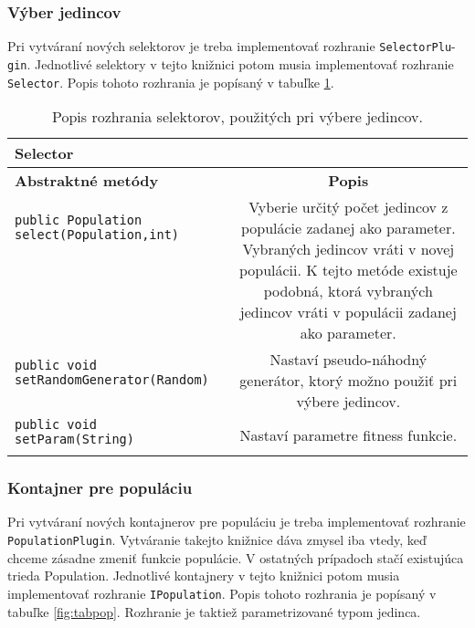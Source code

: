 \subsubsection*{Výber jedincov}
Pri vytváraní nových selektorov je treba implementovať rozhranie \verb|SelectorPlu|- \verb|gin|. Jednotlivé selektory v tejto knižnici potom musia implementovať rozhranie \verb|Selector|. Popis tohoto rozhrania je popísaný v tabuľke \ref{fig:tabsel}.

\begin{table}
\centering
\begin{tabular}{|l|c|}
\hline
\textbf{Selector} & \\
\hline\hline
\textbf{Abstraktné metódy} & \textbf{Popis} \\
\hline
\verb|public Population select(Population,int)| & \multirow{9}{5cm}{Vyberie určitý počet jedincov z populácie zadanej ako parameter. Vybraných jedincov vráti v novej populácii. K tejto metóde existuje podobná, ktorá vybraných jedincov vráti v populácii zadanej ako parameter.} \\
& \\
& \\
& \\
& \\
& \\
& \\
& \\
& \\
\hline
\verb|public void setRandomGenerator(Random)| & \multirow{3}{5cm}{Nastaví pseudo-náhodný generátor, ktorý možno použiť pri výbere jedincov.} \\
& \\
& \\
\hline
\verb|public void setParam(String)| & \multirow{2}{5cm}{Nastaví parametre fitness funkcie.} \\
& \\
\hline
\end{tabular}
\caption{Popis rozhrania selektorov, použitých pri výbere jedincov.}\label{fig:tabsel}
\end{table}

\subsubsection*{Kontajner pre populáciu}
Pri vytváraní nových kontajnerov pre populáciu je treba implementovať rozhranie \verb|PopulationPlugin|. Vytváranie takejto knižnice dáva zmysel iba vtedy, keď chceme zásadne zmeniť funkcie populácie. V ostatných prípadoch stačí existujúca trieda Population. Jednotlivé kontajnery v tejto knižnici potom musia implementovať rozhranie \verb|IPopulation|. Popis tohoto rozhrania je popísaný v tabuľke \ref{fig:tabpop}. Rozhranie je taktiež parametrizované typom jedinca.

